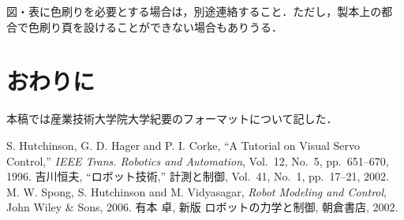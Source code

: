 \documentclass[a4j, 12Q, twocolumn, twoside]{jsarticle}
\begin{document}
図・表に色刷りを必要とする場合は，別途連絡すること．ただし，製本上の都
合で色刷り頁を設けることができない場合もありうる．

\section{おわりに}
本稿では産業技術大学院大学紀要のフォーマットについて記した．

\begin{thebibliography}{99}
S. Hutchinson, G. D. Hager and P. I. Corke,
``A Tutorial on Visual Servo Control,''
{\it IEEE Trans. Robotics and Automation},
Vol.~12, No.~5, pp.~651--670, 1996.
%
吉川恒夫,
``ロボット技術,''
計測と制御, Vol.~41, No.~1, pp.~17--21, 2002.
%
M. W. Spong, S. Hutchinson and M. Vidyasagar, 
{\it Robot Modeling and Control}, 
John Wiley \& Sons, 2006. 
%
有本 卓, 新版 ロボットの力学と制御, 朝倉書店, 2002. 
\end{thebibliography}
\end{document}
